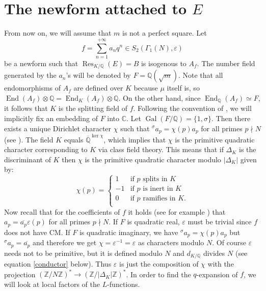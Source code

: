 \documentclass[11pt]{amsart}
\theoremstyle{definition}
\begin{document}
		\section{The newform attached to
\texorpdfstring{$E$}{}}\label{newform}
		From now on, we will assume that $m$ is not a perfect square. Let
		$$f=\sum_{n=1}^{+\infty}a_nq^n \in S_2(\Gamma_1(N),\varepsilon)$$
		be a newform such that $\operatorname{Res}_{K/{\mathbb{Q}}}(E)=B$ is isogenous to $A_f$. The number field generated by the $a_n$'s will be denoted by $F={\mathbb{Q}}(\sqrt{m})$. Note that all endomorphisms of $A_f$ are defined over $K$ because $\mu$ itself is, so $\operatorname{End}(A_f)\otimes {\mathbb{Q}}=\operatorname{End}_{K}(A_f)\otimes {\mathbb{Q}}$. On the other hand, since $\operatorname{End}_{\mathbb{Q}}(A_f)\simeq F$, it follows that $K$ is the splitting field of $f$.
  		Following the convention of \cite{gola}, we will implicitly fix an embedding of $F$ into ${\mathbb{C}}$. Let $\operatorname{Gal}(F/{\mathbb{Q}})=\{1,\sigma\}$. Then there exists a unique Dirichlet character $\chi$ such that ${{}^\sigma\!} a_p=\chi(p)a_p$ for all primes $p\nmid N$ (see \cite{gola}).
  		The field $K$ equals ${\overline{\mathbb{Q}}}^{\ker \chi}$, which implies that $\chi$ is the primitive quadratic character corresponding to $K$ via class field theory. This means that if $\Delta_K$ is the discriminant of $K$ then $\chi$ is the primitive quadratic character modulo $|\Delta_K|$ given by:
    		$$\chi(p)=\begin{cases}
				1 & \mbox{if $p$ splits in $K$} \\
				-1 & \mbox{if $p$ is inert in $K$}\\
				0 & \mbox{if $p$ ramifies in $K$.}\\
		\end{cases}$$
  		Now recall that for the coefficients of $f$ it holds (see for example \cite{rib3}) that $a_p=\overline{a_p}\varepsilon(p)$ for all primes $p\nmid N$.
  		If $F$ is quadratic real, $\varepsilon$ must be trivial since $f$ does not have CM.
  		If $F$ is quadratic imaginary, we have ${{}^\sigma\!} a_p=\chi(p)a_p$ but ${{}^\sigma\!} a_p=\overline{a_p}$ and therefore we get $\chi=\varepsilon^{-1}=\varepsilon$ as characters modulo $N$. Of course $\varepsilon$ needs not to be primitive, but it is defined modulo $N$ and $d_{K/{\mathbb{Q}}}$ divides $N$ (see equation \eqref{conductor} below). Thus $\varepsilon$ is just the composition of $\chi$ with the projection $({\mathbb{Z}}/N{\mathbb{Z}})^*\to ({\mathbb{Z}}/|\Delta_K|{\mathbb{Z}})^*$.
	    In order to find the $q$-expansion of $f$, we will look at local factors of the $L$-functions.
\end{document}
